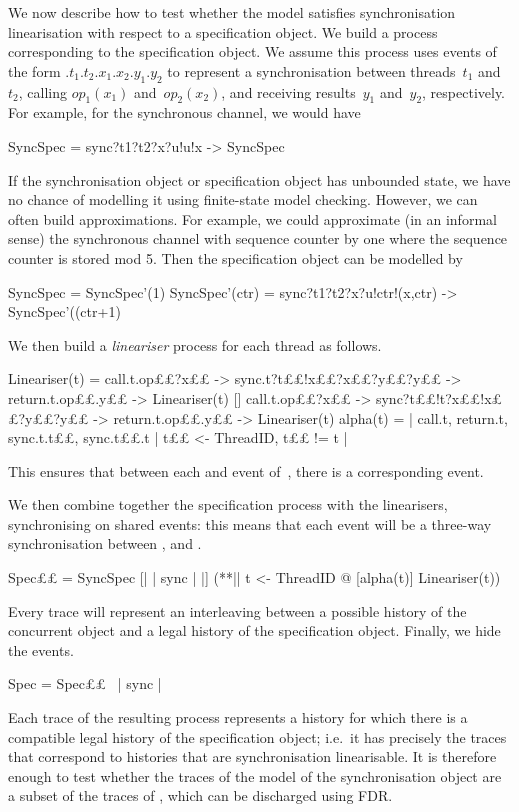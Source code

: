We now describe how to test whether the model satisfies synchronisation
linearisation with respect to a specification object.  We build a process
 corresponding to the specification object.  We assume this
process uses events of the form $.t_1.t_2.x_1.x_2.y_1.y_2$ to
represent a synchronisation between threads~$t_1$ and~$t_2$, calling
$op_1(x_1)$ and~$op_2(x_2)$, and receiving results~$y_1$ and~$y_2$,
respectively.  For example, for the synchronous channel, we would have
%
\begin{cspm}
SyncSpec = sync?t1?t2?x?u!u!x -> SyncSpec
\end{cspm}

If the synchronisation object or specification object has unbounded state, we
have no chance of modelling it using finite-state model checking.  However, we
can often build approximations.  For example, we could approximate (in an
informal sense) the synchronous channel with sequence counter by one where the
sequence counter is stored mod 5.  Then the specification object can
be modelled by
%
\begin{cspm}
SyncSpec = SyncSpec'(1)
SyncSpec'(ctr) = sync?t1?t2?x?u!ctr!(x,ctr) -> SyncSpec'((ctr+1)%
\end{cspm}

We then build a \emph{lineariser} process for each thread as follows.
%
\begin{cspm}
Lineariser(t) = 
  call.t.op££?x££ -> sync.t?t££!x££?x££?y££?y££ -> return.t.op££.y££ -> Lineariser(t)
  []
  call.t.op££?x££ -> sync?t££!t?x££!x££?y££?y££ -> return.t.op££.y££ -> Lineariser(t)
alpha(t) = {| call.t, return.t, sync.t.t££, sync.t££.t | t££ <- ThreadID, t££ != t |} 
\end{cspm}
%
This ensures that between each  and  event
of~, there is a corresponding  event.  

We then combine together the specification process with the linearisers,
synchronising on shared events: this means that each
 event will be a three-way synchronisation between
, \CSPM{)} and
\CSPM{)}.  
\begin{cspm}
Spec££ = SyncSpec [| {| sync |} |] (**|| t <- ThreadID @ [alpha(t)] Lineariser(t))
\end{cspm}
Every trace will represent an interleaving
between a possible history of the concurrent object and a legal history of the
specification object.
%
Finally, we hide the  events. 
\begin{cspm}
Spec = Spec££ \ {| sync |}
\end{cspm}
%
Each trace of the resulting process represents a history for which there is a
compatible legal history of the specification object; i.e.~it has precisely
the traces that correspond to histories that are synchronisation linearisable.
It is therefore enough to test whether the traces of the model of the
synchronisation object are a subset of the traces of , which can be
discharged using FDR.

